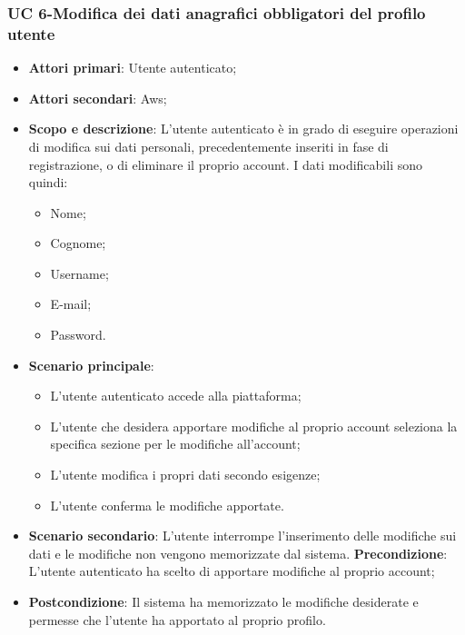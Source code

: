         \subsubsection{UC 6-Modifica dei dati anagrafici obbligatori del profilo utente}
        \begin{itemize}
        \item \textbf{Attori primari}: Utente autenticato;
        \item \textbf{Attori secondari}: Aws;
        \item \textbf{Scopo e descrizione}: L'utente autenticato è in grado di eseguire operazioni di modifica sui dati personali, precedentemente inseriti in fase di registrazione, o di eliminare il proprio account. I dati modificabili sono quindi:
            \begin{itemize}
                \item Nome;
                \item Cognome;
                \item Username;
                \item E-mail;
                \item Password.
            \end{itemize}
        \item \textbf{Scenario principale}:
            \begin{itemize}
                \item L'utente autenticato accede alla piattaforma;
                \item L'utente che desidera apportare modifiche al proprio account seleziona la specifica sezione per le modifiche all'account;
                \item L'utente modifica i propri dati secondo esigenze;
                \item L'utente conferma le modifiche apportate.
            \end{itemize}
        \item \textbf{Scenario secondario}: L'utente interrompe l'inserimento delle modifiche sui dati e le modifiche non vengono memorizzate dal sistema.
         \textbf{Precondizione}: L'utente autenticato ha scelto di apportare modifiche al proprio account;
        \item \textbf{Postcondizione}: Il sistema ha memorizzato le modifiche desiderate e permesse che l’utente ha apportato al proprio profilo.
        \end{itemize}
        
